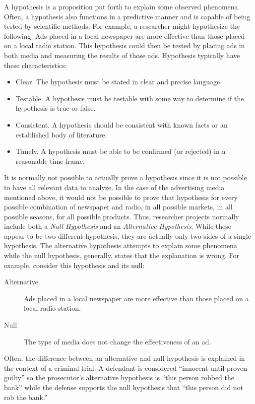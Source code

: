 A hypothesis is a proposition put forth to explain some observed phenomena. Often, a hypothesis also functions in a predictive manner and is capable of being tested by scientific methods. For example, a researcher might hypothesize the following: Ads placed in a local newspaper are more effective than those placed on a local radio station. This hypothesis could then be tested by placing ads in both media and measuring the results of those ads. Hypothesis typically have these characteristics:

\begin{itemize}
	\item Clear. The hypothesis must be stated in clear and precise language.
	\item Testable. A hypothesis must be testable with some way to determine if the hypothesis is true or false.
	\item Consistent. A hypothesis should be consistent with known facts or an established body of literature.
	\item Timely. A hypothesis must be able to be confirmed (or rejected) in a reasonable time frame.
\end{itemize} 

It is normally not possible to actually prove a hypothesis since it is not possible to have all relevant data to analyze. In the case of the advertising media mentioned above, it would not be possible to prove that hypothesis for every possible combination of newspaper and radio, in all possible markets, in all possible seasons, for all possible products. Thus, researcher projects normally include both a \textit{Null Hypothesis} and an \textit{Alternative Hypothesis}. While these appear to be two different hypothesis, they are actually only two sides of a single hypothesis. The alternative hypothesis attempts to explain some phenomena while the null hypothesis, generally, states that the explanation is wrong. For example, consider this hypothesis and its null:

\begin{description}
	\item[Alternative] Ads placed in a local newspaper are more effective than those placed on a local radio station.
	\item[Null] The type of media does not change the effectiveness of an ad.
\end{description}

Often, the difference between an alternative and null hypothesis is explained in the context of a criminal trial. A defendant is considered ``innocent until proven guilty'' so the prosecutor's alternative hypothesis is ``this person robbed the bank'' while the defense supports the null hypothesis that ``this person did not rob the bank.''

